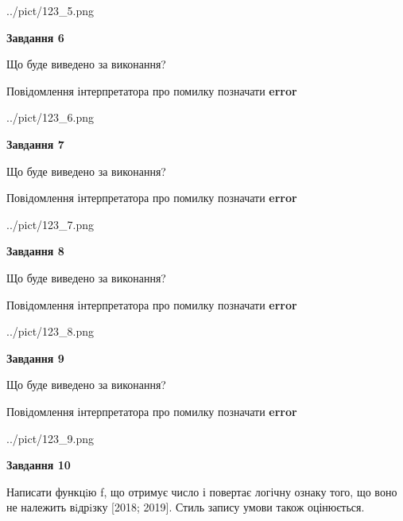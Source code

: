 \documentclass[12pt, ukrainian]{article}
\begin{document}
{\begin {large}
\begin{center}
	{../pict/123_5.png}
\end{center}
\newpage

{\begin {center}\textbf{Завдання 6}\end {center}}\par
Що буде виведено за виконання? \par
Повідомлення інтерпретатора про помилку позначати \textbf{error}

\begin{center}
	{../pict/123_6.png}
\end{center}
\newpage

{\begin {center}\textbf{Завдання 7}\end {center}}\par
Що буде виведено за виконання? \par
Повідомлення інтерпретатора про помилку позначати \textbf{error}

\begin{center}
	{../pict/123_7.png}
\end{center}
\newpage

{\begin {center}\textbf{Завдання 8}\end {center}}\par
Що буде виведено за виконання? \par
Повідомлення інтерпретатора про помилку позначати \textbf{error}

\begin{center}
	{../pict/123_8.png}
\end{center}
\newpage

{\begin {center}\textbf{Завдання 9}\end {center}}\par
Що буде виведено за виконання? \par
Повідомлення інтерпретатора про помилку позначати \textbf{error}

\begin{center}
	{../pict/123_9.png}
\end{center}
\newpage

{\begin {center}\textbf{Завдання 10}\end {center}}\par

Написати функцiю f, що отримує число і повертає логічну ознаку того, що воно не належить вiдрiзку [2018; 2019]. Стиль запису умови також оцінюється.\par
\newpage

\end {large}}
\end{document}
